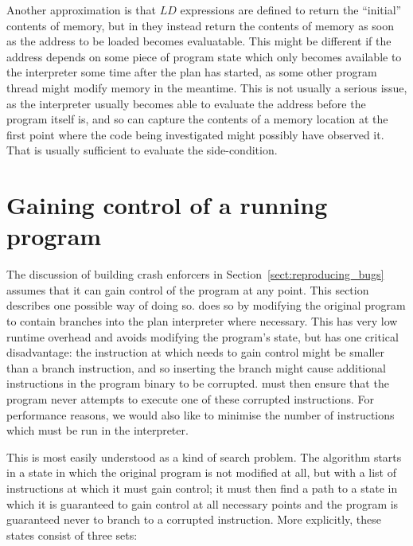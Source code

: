 Another approximation is that $LD$ expressions are defined to return
the ``initial'' contents of memory, but in {\implementation} they
instead return the contents of memory as soon as the address to be
loaded becomes evaluatable.  This might be different if the address
depends on some piece of program state which only becomes available to
the interpreter some time after the plan has started, as some other
program thread might modify memory in the meantime.  This is not
usually a serious issue, as the interpreter usually becomes able to
evaluate the address before the program itself is, and so can capture
the contents of a memory location at the first point where the code
being investigated might possibly have observed it.  That is usually
sufficient to evaluate the side-condition. 

\section{Gaining control of a running program}
\label{sect:enforce:gain_control}

The discussion of building crash enforcers in
Section~\ref{sect:reproducing_bugs} assumes that it can gain control
of the program at any point.  This section describes one possible way
of doing so.  {\Implementation} does so by modifying the original
program to contain branches into the plan interpreter where necessary.
This has very low runtime overhead and avoids modifying the program's
state, but has one critical disadvantage:
the instruction at which {\implementation} needs to gain control might
be smaller than a branch instruction, and so inserting the branch
might cause additional instructions in the program binary to be
corrupted.  {\Implementation} must then ensure that the program never
attempts to execute one of these corrupted instructions.  For
performance reasons, we would also like to minimise the number of
instructions which must be run in the interpreter.

 This is most easily understood as a kind of
search problem.  The algorithm
starts in a state in which the original program is not modified at
all, but with a list of instructions at which it must gain control; it
must then find a path to a state in which it is guaranteed to gain
control at all necessary points and the program is guaranteed never to
branch to a corrupted instruction.  More explicitly, these states
consist of three sets:

